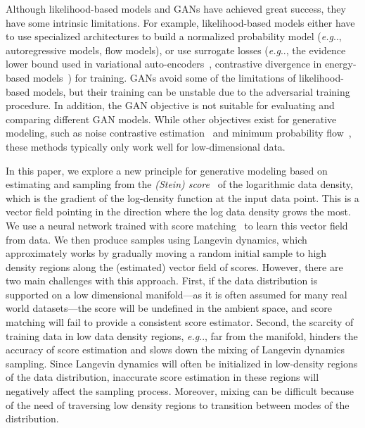 \documentclass{article}
\makeatletter
\def\@onedot{\ifx\@let@token.\else.\null\fi\xspace}
\DeclareRobustCommand\onedot{\futurelet\@let@token\@onedot}
\def\eg{\emph{e.g}\onedot}
\makeatother
\begin{document}
Although likelihood-based models and GANs have achieved great success,
they have some intrinsic limitations.
For example, likelihood-based models either have to use specialized architectures to build a normalized probability model (\eg, autoregressive models, flow models), or use surrogate losses (\eg, the evidence lower bound used in variational auto-encoders~\cite{kingma2014auto}, contrastive divergence in energy-based models~\cite{hinton2002training}) for training. GANs avoid some of the limitations of likelihood-based models, but their training can be unstable due to the adversarial training procedure.
In addition, the GAN objective is not suitable for evaluating and comparing different GAN models.
While other objectives exist for generative modeling, such as noise contrastive estimation~\cite{gutmann2010noise} and minimum probability flow~\cite{sohl2009minimum}, these methods typically only work well for low-dimensional data.



In this paper, we explore a new principle for generative modeling based on estimating and sampling from the \textit{(Stein) score}~\cite{liu2016kernelized} of the logarithmic data density, which is 
the gradient of the log-density function at the input data point.
This is a vector field pointing in the direction where the log data density grows the most. We use a neural network trained with score matching~\cite{hyvarinen2005estimation} to learn this vector field from data.
We then produce samples using Langevin dynamics, which approximately works
by gradually moving a random initial sample to high density regions along the (estimated) vector field of scores.
However, there are two main challenges with this approach. 
First, if the data distribution is supported on a low dimensional manifold---as it is often assumed for many real world datasets---the score will be undefined in the ambient space, and score matching will fail to provide a consistent score estimator. Second, the scarcity of training data in low data density regions, \eg, far from the manifold, hinders the accuracy of score estimation and slows down the mixing of Langevin dynamics sampling. Since Langevin dynamics will often be initialized in low-density regions of the data distribution, inaccurate score estimation in these regions will 
negatively affect the sampling process. 
Moreover, mixing can be difficult 
because of the need of traversing low density regions to transition between modes of the distribution. 
\end{document}
